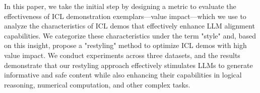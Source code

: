 In this paper, we take the initial step by designing a metric to evaluate the effectiveness of ICL demonstration exemplars—value impact—which we use to analyze the characteristics of ICL demos that effectively enhance LLM alignment capabilities. We categorize these characteristics under the term "style" and, based on this insight, propose a "restyling" method to optimize ICL demos with high value impact.
We conduct experiments across three datasets, and the results demonstrate that our restyling approach effectively stimulates LLMs to generate informative and safe content while also enhancing their capabilities in logical reasoning, numerical computation, and other complex tasks.